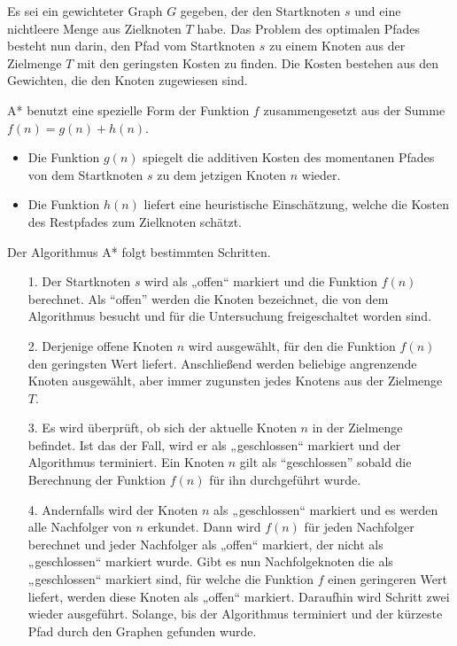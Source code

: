 Es sei ein gewichteter Graph $G$ gegeben, der den Startknoten $s$ und eine nichtleere Menge aus Zielknoten $T$ habe. Das Problem des optimalen Pfades besteht nun darin, den Pfad vom Startknoten $s$ zu einem Knoten aus der Zielmenge $T$ mit den geringsten Kosten zu finden. %
Die Kosten bestehen aus den Gewichten, die den Knoten zugewiesen sind\cite{RinaDechterandJudeaPearl.1983}.

A* benutzt eine spezielle Form der Funktion $f$ zusammengesetzt aus der Summe $f(n) = g(n) + h(n)$.
\begin{itemize}
\item Die Funktion $g(n)$ spiegelt die additiven Kosten des momentanen Pfades von dem Startknoten $s$ zu dem jetzigen Knoten $n$ wieder.
\item Die Funktion $h(n)$ liefert eine heuristische Einschätzung, welche die Kosten des Restpfades zum Zielknoten schätzt\cite{RinaDechterandJudeaPearl.1983}. %
\end{itemize}

Der Algorithmus A* folgt bestimmten Schritten.
\begin{itemize}
\item[1.] Der Startknoten $s$ wird als „offen“ markiert und die Funktion $f(n)$ berechnet. Als “offen” werden die Knoten bezeichnet, die von dem Algorithmus besucht und für die Untersuchung freigeschaltet worden sind.
\item[2.] Derjenige offene Knoten $n$ wird ausgewählt, für den die Funktion $f(n)$
den geringsten Wert liefert. Anschließend werden beliebige angrenzende Knoten ausgewählt, aber immer zugunsten jedes Knotens aus der Zielmenge $T$.
\item[3.] Es wird überprüft, ob sich der aktuelle Knoten $n$ in der Zielmenge befindet. Ist das der Fall, wird er als „geschlossen“ markiert und der Algorithmus terminiert. Ein Knoten $n$ gilt als “geschlossen” sobald die Berechnung der Funktion $f(n)$ für ihn durchgeführt wurde.
\item[4.]
Andernfalls wird der Knoten $n$ als „geschlossen“ markiert und es werden alle Nachfolger von $n$ erkundet. Dann wird $f(n)$ für jeden Nachfolger berechnet und jeder Nachfolger als „offen“ markiert, der nicht als „geschlossen“ markiert wurde. Gibt es nun Nachfolgeknoten die als „geschlossen“ markiert sind, für welche die Funktion $f$ einen geringeren Wert liefert, werden diese Knoten als „offen“ markiert. Daraufhin wird Schritt zwei wieder ausgeführt. Solange, bis der Algorithmus terminiert und der kürzeste Pfad durch den Graphen gefunden wurde\cite{HartNilssonandRaphael.1968}.
\end{itemize}
